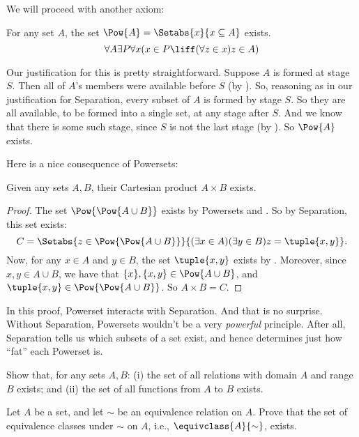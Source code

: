 \documentclass[../../../include/open-logic-section]{subfiles}
\begin{document}

We will proceed with another axiom:

\begin{axiom}[Powersets]
For any set $A$, the set $\Pow{A} = \Setabs{x}{x \subseteq A}$ exists.
\[
	\forall A \exists P \forall x(x \in P \liff (\forall z \in x)z \in A)
\]
\end{axiom}

Our justification for this is pretty straightforward. Suppose $A$ is
formed at stage $S$. Then all of $A$'s members were available before
$S$ (by \stagesacc). So, reasoning as in our justification for
Separation, every subset of $A$ is formed by stage $S$. So they are
all available, to be formed into a single set, at any stage after $S$.
And we know that there is some such stage, since $S$ is not the last
stage (by \stagessucc). So $\Pow{A}$ exists.

Here is a nice consequence of Powersets:

\begin{prop}\label{thm:Products}
Given any sets $A, B$, their Cartesian product $A \times B$ exists.
\end{prop}

\begin{proof}
The set $\Pow{\Pow{A \cup B}}$ exists by Powersets and
. So by Separation, this
set exists:
\[
	C = \Setabs{z \in \Pow{\Pow{A \cup B}}}{(\exists x \in A)(\exists y \in B) z = \tuple{x, y}}.
\]
Now, for any $x \in A$ and $y \in B$, the set $\tuple{x, y}$ exists by
. Moreover, since $x, y
\in A \cup B$, we have that $\{x\}, \{x, y\} \in \Pow{A \cup B}$, and
$\tuple{x,y} \in \Pow{\Pow{A \cup B}}$. So $A \times B = C$.
\end{proof}

In this proof, Powerset interacts with Separation. And that is no
surprise. Without Separation, Powersets wouldn't be a very
\emph{powerful} principle. After all, Separation tells us which
subsets of a set exist, and hence determines just how ``fat'' each
Powerset is.

\begin{prob}
Show that, for any sets $A, B$: (i) the set of all relations with
domain $A$ and range $B$ exists; and (ii) the set of all functions
from $A$ to $B$ exists.
\end{prob}

\begin{prob}
Let $A$ be a set, and let $\sim$ be an equivalence relation on $A$.
Prove that the set of equivalence classes under $\sim$ on $A$, i.e.,
$\equivclass{A}{\sim}$, exists.
\end{prob}
\end{document}
